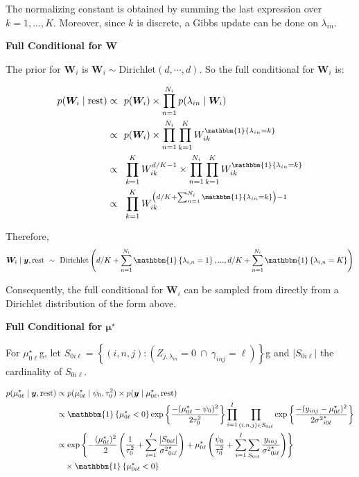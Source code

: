 \documentclass[12pt,]{article}
\newcommand{\p}[1]{\left(#1\right)}
\newcommand{\bc}[1]{ \left\{#1\right\} }
\def\Dir{\text{Dirichlet}}
\def\lin{\lambda_{in}}
\def\y{\bm{y}}
\def\mus{\mu^\star}
\newcommand{\Ind}[1]{\mathbbm{1}\bc{#1}}
\def\rest{\text{rest}}
\begin{document}
The normalizing constant is obtained by summing the last expression over
\(k = 1,...,K\). Moreover, since \(k\) is discrete, a Gibbs update can
be done on \(\lin\).

\textbf{Full Conditional for $\bm W$}

The prior for \(\bm{W}_i\) is \(\bm W_i \sim \Dir(d, \cdots, d)\). So
the full conditional for \(\bm{W}_i\) is:

\begin{align*}
p(\bm W_i \mid \rest) \propto&~~ p(\bm{W}_i) \times \prod_{n=1}^{N_i} p(\lin \mid \bm{W}_i)\\
\propto&~~ p(\bm{W}_i) \times \prod_{n=1}^{N_i}\prod_{k=1}^K W_{ik}^{\Ind{\lin=k}}\\
\propto&~~ \prod_{k=1}^K W_{ik}^{d/K-1} \times \prod_{n=1}^{N_i}\prod_{k=1}^K W_{ik}^{\Ind{\lin=k}}\\
\propto&~~ \prod_{k=1}^K W_{ik}^{\p{d/K + \sum_{n=1}^{N_i}\Ind{\lin=k}}-1}\\
%
\end{align*}

Therefore, \[
\bm{W}_i \mid \y,\rest ~\sim~ \Dir\p{d/K+\sum_{n=1}^{N_i}\Ind{\lambda_{i,n}=1},...,d/K+\sum_{n=1}^{N_i}\Ind{\lambda_{i,n}=K}} 
\]

Consequently, the full conditional for \(\bm{W}_i\) can be sampled from
directly from a Dirichlet distribution of the form above.
\vspace{2em}


\textbf{Full Conditional for $\bm\mu^\star$}

For \(\mus_{0\ell}\)g, let
\(S_{0i\ell} = \bc{(i,n,j) : \p{Z_{j,\lin} = 0 ~\cap~ \gamma_{inj} = \ell}}\)g
and \(|S_{0i\ell}|\) the cardinality of \(S_{0i\ell}\).

\newcommand\musZeroPostvarDenom{
  \frac{1}{\tau^2_0} + \sum_{i=1}^I\frac{|S_{0i\ell}|}{{\sigma^2}^\star_{0i\ell}}
}
\newcommand\musZeroPostMeanNum{
  \frac{\psi_0}{\tau^2_0} + 
  \sum_{i=1}^I \sum_{S_{0i\ell}}  
  \frac{y_{inj}}{{\sigma^2}^\star_{0i\ell}}
}

\begin{align*}
p(\mus_{0\ell} \mid \y, \rest) &\propto 
p(\mus_{0\ell} \mid \psi_0, \tau^2_0) \times p(\y \mid \mus_{0\ell},\rest) \\
%
&\propto
\Ind{\mus_{0\ell}<0} \exp\bc{\frac{-(\mus_{0\ell} - \psi_0)^2}{2\tau^2_{0}}}
\prod_{i=1}^I\prod_{(i,n,j)\in S_{0i\ell}} \exp\bc{\frac{-(y_{inj} - \mus_{0\ell})^2}{2{\sigma^2}^\star_{i0\ell}}} \\
%
&\propto
\exp\bc{
  -\frac{(\mus_{0\ell})^2}{2}\p{\musZeroPostvarDenom} + 
  \mus_{0\ell}\p{\musZeroPostMeanNum}
} \\ 
& ~~~ \times \Ind{\mus_{0i\ell}<0} \\
\end{align*}
\end{document}

